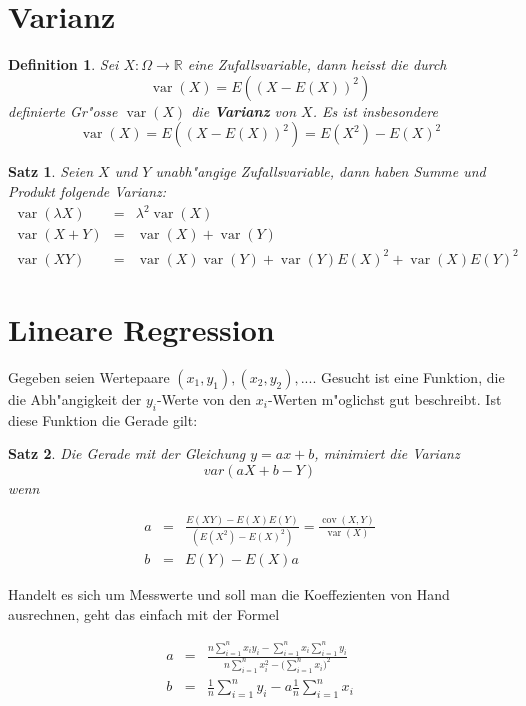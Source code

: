 \documentclass[ngerman, a4paper, 10pt, twocolumn, DIV20, headings=small]{scrartcl}
\newtheorem{definition}{Definition}
\newtheorem{satz}{Satz}
\begin{document}
\section{Varianz}
\label{sec:varianz}

\begin{definition}
Sei $X\colon\Omega\to\mathbb{R}$ eine Zufallsvariable, dann
heisst die durch 
\[
\operatorname{var}(X)=E((X-E(X))^2)
\]
 definierte Gr"osse $\operatorname{var}(X)$ die
{\bf Varianz} von $X$. Es ist insbesondere
\[
\operatorname{var}(X)=E((X-E(X))^2)=E(X^2)-E(X)^2
\]
\end{definition}

\begin{satz}
\label{rechenregeln-varianz}
Seien $X$ und $Y$ unabh"angige Zufallsvariable, dann haben
Summe und Produkt folgende Varianz:
\begin{eqnarray*}
\operatorname{var}(\lambda X)&=&\lambda^2\operatorname{var}(X)\\
\operatorname{var}(X+Y)&=&\operatorname{var}(X)+\operatorname{var}(Y)\\
\operatorname{var}(XY)&=&\operatorname{var}(X)\operatorname{var}(Y)
+
\operatorname{var}(Y)E(X)^2+\operatorname{var}(X)E(Y)^2
\end{eqnarray*}
\end{satz}

\section{Lineare Regression}
\label{sec:lineareregression}

Gegeben seien Wertepaare $(x_1, y_1), (x_2, y_2), ...$. Gesucht ist eine Funktion, die die Abh"angigkeit der $y_i$-Werte von den $x_i$-Werten m"oglichst gut beschreibt. Ist diese Funktion die Gerade gilt:
\begin{satz}
  Die Gerade mit der Gleichung $y = ax + b$, minimiert die Varianz
\[
var(aX + b - Y)
\]
wenn

\begin{eqnarray*}
a&=&\frac{E(XY)-E(X)E(Y)}{(E(X^2)-E(X)^2)}=\frac{\operatorname{cov}(X,Y)}{\operatorname{var}(X)}\\
b&=&E(Y)-E(X)a
\end{eqnarray*}

\end{satz}

Handelt es sich um Messwerte und soll man die Koeffezienten von Hand ausrechnen, geht das einfach mit der Formel

\begin{eqnarray*}
a&=&\frac{\displaystyle n\sum_{i=1}^nx_iy_i-\sum_{i=1}^nx_i\sum_{i=1}^ny_i}{\displaystyle n\sum_{i=1}^nx_i^2-\biggl(\sum_{i=1}^nx_i\biggr)^2}\\
b&=&\frac1n\sum_{i=1}^ny_i-a\frac1n\sum_{i=1}^nx_i\\
\end{eqnarray*}
\end{document}
